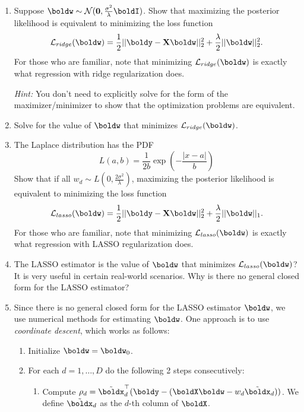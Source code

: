 \documentclass[submit]{harvardml}
\begin{document}
\begin{problem}
    \begin{enumerate}
        \item Suppose $\boldw \sim \mathcal{N}(\mathbf{0},\frac{\sigma^2}{\lambda}\boldI)$. Show that maximizing the posterior likelihood is equivalent to minimizing the loss function
        \[\mathcal{L}_{ridge}(\boldw) = \frac{1}{2}||\boldy -\bold X\boldw||_2^2 + \frac{\lambda}{2}||\boldw||_2^2.\] 
        For those who are familiar, note that minimizing $\mathcal{L}_{ridge}(\boldw)$ is exactly what regression with ridge regularization does.
        
        \textit{Hint:} You don't need to explicitly solve for the form of the maximizer/minimizer to show that the optimization problems are equivalent.
        
        \item Solve for the value of $\boldw$ that minimizes $\mathcal L_{ridge}(\boldw)$.
    
        \item The Laplace distribution has the PDF
       \[L(a,b) =\frac{1}{2b} \exp\left(-\frac{|x - a|}{b}\right)\]
        Show that if all $w_d \sim L\left(0,\frac{2\sigma^2}{\lambda}\right)$, maximizing the posterior likelihood is equivalent to minimizing the loss function
        \[\mathcal{L}_{lasso}(\boldw) = \frac{1}{2}||\boldy -\bold X\boldw||_2^2  + \frac{\lambda}{2}||\boldw||_1.\] 
        For those who are familiar, note that minimizing $\mathcal{L}_{lasso}(\boldw)$ is exactly what regression with LASSO regularization does.
    
        \item The LASSO estimator is the value of $\boldw$ that minimizes $\mathcal{L}_{lasso}(\boldw)$? It is very useful in certain real-world scenarios. Why is there no general closed form for the LASSO estimator?
    
        \item Since there is no general closed form for the LASSO estimator $\boldw$, we use numerical methods for estimating $\boldw$. One approach is to use \textit{coordinate descent}, which works as follows: 
        \begin{enumerate}
            \item Initialize $\boldw=\boldw_0$.
            \item For each $d=1, \ldots, D$ do the following 2 steps consecutively:
            \begin{enumerate}
                \item Compute $\rho_d = \tilde{\boldx}_d^\top(\boldy - (\boldX \boldw - w_d \tilde{\boldx}_d))$. We define $\tilde{\boldx}_d$ as the $d$-th column of $\boldX$.
    

\end{enumerate}
\end{enumerate}
\end{enumerate}
\end{problem}
\end{document}
